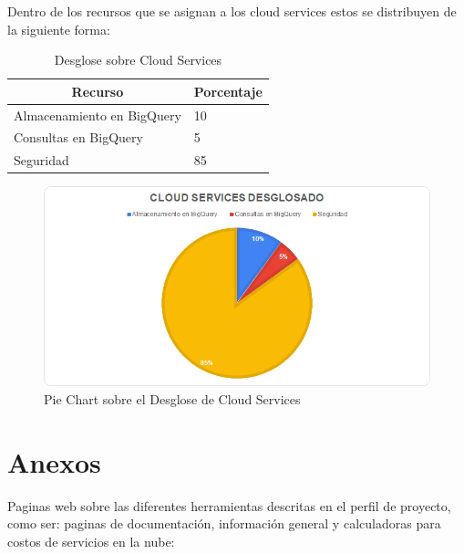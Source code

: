 \documentclass[12pt,a4paper,openright]{article}
\begin{document}
\newpage
Dentro de los recursos que se asignan a los cloud services estos se distribuyen de la siguiente forma:



\begin{table}[h!]
\centering
\begin{tabular}{|l|l|}
\hline
\multicolumn{1}{|c|}{\textbf{Recurso}} & \multicolumn{1}{c|}{\textbf{Porcentaje}} \\ \hline \hline
Almacenamiento en BigQuery             & 10                                       \\ \hline
Consultas en BigQuery                  & 5                                        \\ \hline
Seguridad                              & 85                                       \\ \hline
\end{tabular}
\caption{Desglose sobre Cloud Services}
\end{table}

\begin{figure}[h!]
\includegraphics[width=\textwidth]{TC2.png}
\centering
\caption{Pie Chart sobre el Desglose de Cloud Services}
\end{figure}

\newpage
\section{Anexos}
Paginas web sobre las diferentes herramientas descritas en el perfil de proyecto, como ser: paginas de documentaci\'on, información general y calculadoras para costos de servicios en la nube:
\end{document}
